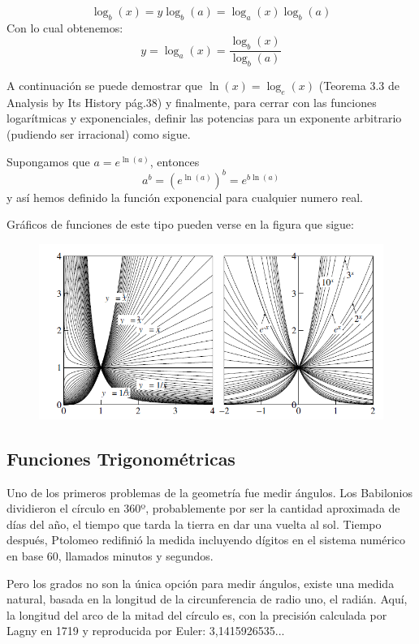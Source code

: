 \documentclass[a4paper,10pt,BCOR10mm,oneside,headsepline]{scrbook}
\begin{document}
\[ \log_{b}(x)=y\log_{b}(a)=\log_{a}(x)\log_{b}(a) 
    \]
Con lo cual obtenemos:
\begin{equation}
    y=\log_{a}(x)=\frac{\log_{b}(x)}{\log_{b}(a)} 
\end{equation} 

A continuación se puede demostrar que $\ln(x)=\log_{e}(x)$ (Teorema 3.3 de Analysis by Its History pág.38) y finalmente, para cerrar con las funciones logarítmicas y exponenciales, definir las potencias para un exponente arbitrario (pudiendo ser irracional) como sigue.

Supongamos que $a=e^{\ln(a)}$, entonces
\[a^b=(e^{\ln(a)})^{b}=e^{b\ln(a)}\]
y así hemos definido la función exponencial para cualquier numero real.

Gráficos de funciones de este tipo pueden verse en la figura que sigue:

\begin{figure}[h!]
\centering
    \includegraphics[width=0.7\linewidth]{exp2.png}
  \label{fig:exp}
\end{figure}

\newpage
\subsection{Funciones Trigonométricas} 

Uno de los primeros problemas de la geometría fue medir ángulos. Los Babilonios dividieron el círculo en 360º, probablemente por ser la cantidad aproximada de días del año, el tiempo que tarda la tierra en dar una vuelta al sol. Tiempo después, Ptolomeo redifinió la medida incluyendo dígitos en el sistema numérico en base 60, llamados minutos y segundos.

Pero los grados no son la única opción para medir ángulos, existe una medida natural, basada en la longitud de la circunferencia de radio uno, el radián. Aquí, la longitud del arco de la mitad del círculo es, con la precisión calculada por Lagny en 1719 y reproducida por Euler: 3,1415926535...
\end{document}
